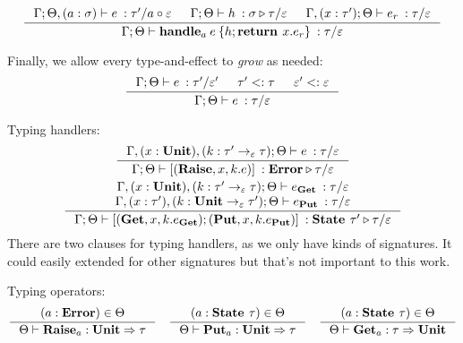 \documentclass[declaration,shortabstract]{iithesis}
\newcommand{\types}[4][\Gamma;\Theta]{\ensuremath{{{#1} \vdash {#2} \: : {#3}/{#4}}}}
\newcommand{\arrow}[3]{{#1}\rightarrow_{#2}{#3}}
\newcommand{\optypes}[5][\Theta]{\ensuremath{{#1}\vdash{#2}_{#3} : {#4} \Rightarrow {#5}}}
\begin{document}
$$
 \inference{
    \types[\Gamma;\Theta,(a:\sigma)]{e}{\tau'}{a \circ \varepsilon} &
    \types{h}{\sigma \triangleright \tau}{\varepsilon} &
    \types[\Gamma,(x:\tau');\Theta]{e_r}{\tau}{\varepsilon}
}{
    \types{\textbf{handle}_a \: e\: \{h;\textbf{return } x. e_r\}}{\tau}{\varepsilon}
}
$$


Finally, we allow every type-and-effect to \textit{grow} as needed:
$$
\inference{
    \types{e}{\tau'}{\varepsilon'} & \tau' <: \tau & \varepsilon' <: \varepsilon
}{
    \types{e}{\tau}{\varepsilon}
}
$$

Typing handlers:
\begin{gather*}
\begin{gathered}
\inference{
    \types[\Gamma,(x:\textbf{Unit}), (k:\arrow{\tau'}{\varepsilon}{\tau});\Theta]{e}{\tau}{\varepsilon}
}{ 
    \types{ [(\textbf{Raise}, x, k. e)]}{\textbf{Error}\triangleright \tau}{\varepsilon}
}
\\
\inference{
\types[\Gamma,(x:\textbf{Unit}), (k:\arrow{\tau'}{\varepsilon}{\tau});\Theta]{e_\textbf{Get}}{\tau}{\varepsilon} \\
\types[\Gamma,(x:\tau'),(k:\arrow{\textbf{Unit}}{\varepsilon}{\tau'});\Theta]{e_\textbf{Put}}{\tau}{\varepsilon} 
}{
\types{ [(\textbf{Get}, x, k. e_\textbf{Get});(\textbf{Put}, x, k. e_\textbf{Put})]}{\textbf{State }\tau'\triangleright \tau}{\varepsilon} 
}
\end{gathered}
\end{gather*}
There are two clauses for typing handlers, as we only have kinds of signatures. It could easily extended for other signatures but that's not important to this work.

Typing operators:
\begin{gather*}
\begin{gathered}
\inference{
    (a : \textbf{Error}) \in \Theta
}{
    \optypes{\textbf{Raise}}{a}{\textbf{Unit}}{\tau}
}
\quad 
\inference{
    (a : \textbf{State }\tau) \in \Theta
}{
    \optypes{\textbf{Put}}{a}{\textbf{Unit}}{\tau}
}
\quad 
\inference{
    (a : \textbf{State }\tau) \in \Theta
}{
    \optypes{\textbf{Get}}{a}{\tau}{\textbf{Unit}}
}
\end{gathered}
\end{gather*}

\end{document}
